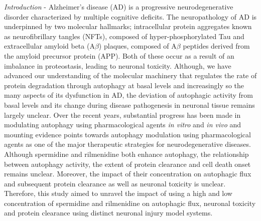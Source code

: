 \textit{Introduction} - Alzheimer’s disease (AD) is a progressive neurodegenerative disorder characterized by multiple cognitive deficits. The neuropathology of AD is underpinned by two molecular hallmarks; intracellular protein aggregates known as neurofibrillary tangles (NFTs), composed of hyper-phosphorylated Tau and extracellular amyloid beta (A$\beta$) plaques, composed of A$\beta$ peptides derived from the amyloid precursor protein (APP). Both of these occur as a result of an imbalance in proteostasis, leading to neuronal toxicity. Although, we have advanced our understanding of the molecular machinery that regulates the rate of protein degradation through autophagy at basal levels and increasingly so the many aspects of its dysfunction in AD, the deviation of autophagic activity from basal levels and its change during disease pathogenesis in neuronal tissue remains largely unclear. Over the recent years, substantial progress has been made in modulating autophagy using pharmacological agents \textit{in vitro} and \textit{in vivo} and mounting evidence points towards autophagy modulation using pharmacological agents as one of the major therapeutic strategies for neurodegenerative diseases. Although spermidine and rilmenidine both enhance autophagy, the relationship between autophagy activity, the extent of protein clearance and cell death onset remains unclear. Moreover, the impact of their concentration on autophagic flux and subsequent protein clearance as well as neuronal toxicity is unclear. Therefore, this study aimed to unravel the impact of using a high and low concentration of spermidine and rilmenidine on autophagic flux, neuronal toxicity and protein clearance using distinct neuronal injury model systems. 

